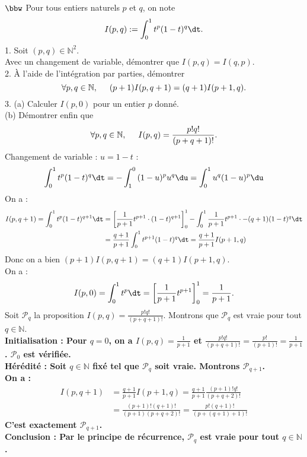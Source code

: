 \documentclass[11pt]{article}
\begin{document}
\begin{exercice}{$\bbw$}{}
    Pour tous entiers naturels $p$ et $q$, on note
    \begin{equation*}
        I(p,q):=\int_0^1{t^p(1-t)^q\dt}.
    \end{equation*}
    1. Soit $(p,q)\in\mathbb{N}^2$.\\
    Avec un changement de variable, démontrer que $I(p,q)=I(q,p)$.\\
    2. À l'aide de l'intégration par parties, démontrer
    \begin{equation*}
        \forall{p,q\in\mathbb{N}}, \hspace{0.5cm} (p+1)I(p,q+1)=(q+1)I(p+1,q).
    \end{equation*}
    3. (a) Calculer $I(p,0)$ pour un entier $p$ donné.\\
    (b) Démontrer enfin que
    \begin{equation*}
        \forall{p,q\in\mathbb{N}}, \hspace{0.5cm} I(p,q)=\frac{p!q!}{(p+q+1)!}.
    \end{equation*}
    \tcblower
     Changement de variable : $u=1-t$ :
    \begin{align*}
        \int^1_0{t^p(1-t)^q\dt}=-\int_1^0{(1-u)^pu^q\du}=\int_0^1{u^q(1-u)^p\du}
    \end{align*}
     On a :
    \begin{align*}
        I(p,q+1)=\int^1_0{t^p(1-t)^{q+1}\dt}&=\left[\frac{1}{p+1}t^{p+1}\cdot(1-t)^{q+1}\right]_0^1-\int_0^1{\frac{1}{p+1}t^{p+1}\cdot-(q+1)(1-t)^{q}\dt}\\
        &=\frac{q+1}{p+1}\int_0^1{t^{p+1}(1-t)^{q}\dt}=\frac{q+1}{p+1}I(p+1,q)
    \end{align*}
    Donc on a bien $(p+1)I(p,q+1)=(q+1)I(p+1,q)$.\\
     On a :
    \begin{align*}
        I(p,0)=\int_0^1{t^p\dt}=\left[\frac{1}{p+1}t^{p+1}\right]_0^1=\frac{1}{p+1}.
    \end{align*}
     Soit $\mathcal{P}_q$ la proposition $I(p,q)=\frac{p!q!}{(p+q+1)!}$. Montrons que $\mathcal{P}_q$ est vraie pour tout $q\in\mathbb{N}$.\\
    \bf{Initialisation :} Pour $q=0$, on a $I(p,q)=\frac{1}{p+1}$ et $\frac{p!q!}{(p+q+1)!}=\frac{p!}{(p+1)!}=\frac{1}{p+1}$. $\mathcal{P}_0$ est vérifiée.\\
    \bf{Hérédité :} Soit $q\in\mathbb{N}$ fixé tel que $\mathcal{P}_q$ soit vraie. Montrons $\mathcal{P}_{q+1}$.\\
    On a :
    \begin{align*}
        I(p,q+1)&=\frac{q+1}{p+1}I(p+1,q)=\frac{q+1}{p+1}\frac{(p+1)!q!}{(p+q+2)!}\\
        &=\frac{(p+1)!(q+1)!}{(p+1)(p+q+2)!}=\frac{p!(q+1)!}{(p+(q+1)+1)!}
    \end{align*}
    C'est exactement $\mathcal{P}_{q+1}$.\\
    \bf{Conclusion :} Par le principe de récurrence, $\mathcal{P}_q$ est vraie pour tout $q\in\mathbb{N}$.
\end{exercice}
\end{document}
